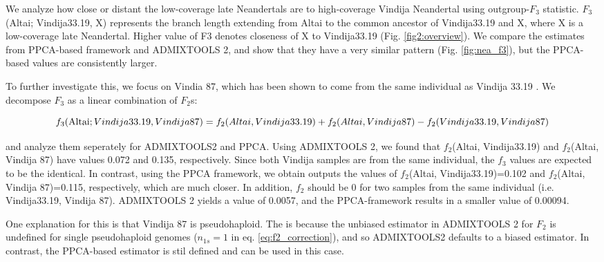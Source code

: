 \documentclass[12pt, letterpaper]{article}
\begin{document}
We analyze how close or distant the low-coverage late Neandertals are to high-coverage Vindija Neandertal using outgroup-$F_3$ statistic. $F_3$(Altai; Vindija33.19, X) represents the branch length extending from Altai to the common ancestor of Vindija33.19 and X, where X is a low-coverage late Neandertal. Higher value of F3 denotes closeness of X to Vindija33.19 (Fig. \ref{fig2:overview}). We compare the estimates from PPCA-based framework and ADMIXTOOLS 2, and show that they have a very similar pattern (Fig. \ref{fig:nea_f3}), but the PPCA-based values are consistently larger. 

To further investigate this, we focus on Vindia 87, which has been shown to come from the same individual as Vindija 33.19 \citep{hajdinjak_reconstructing_2018}. We decompose  $F_3$ as a linear combination of $F_2$s:

\begin{dmath}
    f_3(\text{Altai}; Vindija33.19, Vindija 87) = f_2(Altai, Vindija33.19) + f_2(Altai, Vindija 87) - f_2(Vindija33.19, Vindija 87)\\
\end{dmath}

and analyze them seperately for ADMIXTOOLS2 and PPCA.
Using ADMIXTOOLS 2, we found that $f_2$(Altai, Vindija33.19) and $f_2$(Altai, Vindija 87) have values 0.072 and 0.135,  respectively. Since both Vindija samples are from the same individual, the $f_3$ values are expected to be the identical. In contrast, using the PPCA framework, we obtain outputs the values of $f_2$(Altai, Vindija33.19)=0.102 and $f_2$(Altai, Vindija 87)=0.115, respectively, which are much closer. In addition, $f_2$ should be 0 for two samples from the same individual (i.e. Vindija33.19, Vindija 87). ADMIXTOOLS 2 yields a value of 0.0057, and the PPCA-framework results in a smaller value of 0.00094. 

One explanation for this is that Vindija 87 is pseudohaploid. The is because the unbiased estimator in ADMIXTOOLS 2 for $F_2$ is undefined for single pseudohaploid genomes ($n_{1s}=1$ in eq. \ref{eq:f2_correction}), and so ADMIXTOOLS2 defaults to a biased estimator. In contrast, the PPCA-based estimator is stil defined and can be used in this case. 
\end{document}

